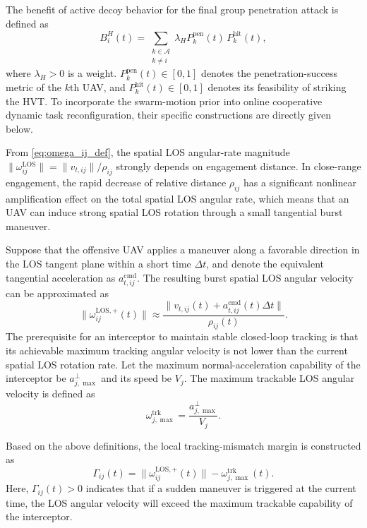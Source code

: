 \documentclass{cja}
\begin{document}
The benefit of active decoy behavior for the final group penetration attack is defined as
\begin{equation}
B_i^{H}(t)
=
\sum_{\substack{k\in\mathcal{A}\\k\neq i}}
\lambda_H P_k^{\mathrm{pen}}(t)\,P_k^{\mathrm{hit}}(t),
\end{equation}
where $\lambda_H>0$ is a weight. $P_k^{\mathrm{pen}}(t)\in[0,1]$ denotes the penetration-success metric of the $k$th UAV, and $P_k^{\mathrm{hit}}(t)\in[0,1]$ denotes its feasibility of striking the HVT. To incorporate the swarm-motion prior into online cooperative dynamic task reconfiguration, their specific constructions are directly given below.

From \eqref{eq:omega_ij_def}, the spatial LOS angular-rate magnitude $\|\omega_{ij}^{\mathrm{LOS}}\| = \|v_{t,ij}\|/\rho_{ij}$ strongly depends on engagement distance. In close-range engagement, the rapid decrease of relative distance $\rho_{ij}$ has a significant nonlinear amplification effect on the total spatial LOS angular rate, which means that an UAV can induce strong spatial LOS rotation through a small tangential burst maneuver.

Suppose that the offensive UAV applies a maneuver along a favorable direction in the LOS tangent plane within a short time $\Delta t$, and denote the equivalent tangential acceleration as $a_{t,ij}^{\mathrm{cmd}}$. The resulting burst spatial LOS angular velocity can be approximated as
\begin{equation}
\|\omega_{ij}^{\mathrm{LOS},+}(t)\|
\approx
\frac{\|v_{t,ij}(t)+a_{t,ij}^{\mathrm{cmd}}(t)\Delta t\|}{\rho_{ij}(t)}.
\end{equation}
The prerequisite for an interceptor to maintain stable closed-loop tracking is that its achievable maximum tracking angular velocity is not lower than the current spatial LOS rotation rate. Let the maximum normal-acceleration capability of the interceptor be $a_{j,\max}^{\perp}$ and its speed be $V_j$. The maximum trackable LOS angular velocity is defined as
\begin{equation}
\omega_{j,\max}^{\mathrm{trk}}
=
\frac{a_{j,\max}^{\perp}}{V_j}.
\end{equation}

Based on the above definitions, the local tracking-mismatch margin is constructed as
\begin{equation}
\Gamma_{ij}(t)
=
\|\omega_{ij}^{\mathrm{LOS},+}(t)\|
-
\omega_{j,\max}^{\mathrm{trk}}(t).
\end{equation}
Here, $\Gamma_{ij}(t)>0$ indicates that if a sudden maneuver is triggered at the current time, the LOS angular velocity will exceed the maximum trackable capability of the interceptor.
\end{document}
